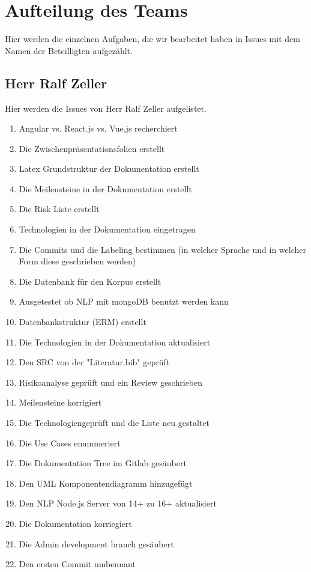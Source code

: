 \section{Aufteilung des Teams}
Hier werden die einzelnen Aufgaben, die wir bearbeitet haben in Issues mit dem Namen der Beteilligten aufgezählt.

\subsection{Herr Ralf Zeller}
Hier werden die Issues von Herr Ralf Zeller aufgelistet.
\begin{enumerate}
\item Angular vs. React.js vs, Vue.js recherchiert
\item Die Zwischenpräsentationsfolien erstellt
\item Latex Grundstruktur der Dokumentation erstellt
\item Die Meilensteine in der Dokumentation erstellt
\item Die Risk Liste erstellt
\item Technologien in der Dokumentation eingetragen
\item Die Commits und die Labeling bestimmen (in welcher Sprache und in welcher Form diese geschrieben werden)
\item Die Datenbank für den Korpus erstellt
\item Ausgetestet ob NLP mit mongoDB benutzt werden kann 
\item Datenbankstruktur (ERM) erstellt
\item Die Technologien in der Dokumentation aktualisiert
\item Den SRC von der "Literatur.bib" geprüft
\item Risikoanalyse geprüft und ein Review geschrieben
\item Meilensteine korrigiert
\item Die Technologiengeprüft und die Liste neu gestaltet
\item Die Use Cases enummeriert
\item Die Dokumentation Tree im Gitlab gesäubert
\item Den UML Komponentendiagramm hinzugefügt
\item Den NLP Node.js Server von  14+ zu 16+ aktualisiert
\item Die Dokumentation korriegiert
\item Die Admin development branch gesäubert
\item Den ersten Commit umbennant

\end{enumerate}

